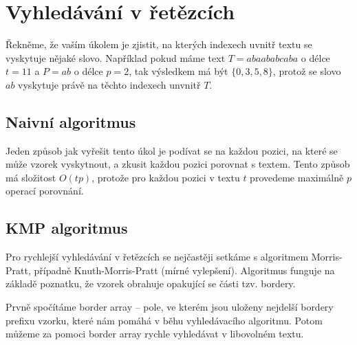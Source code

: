 \documentclass{article}
\begin{document}
\section{Vyhledávání v řetězcích}
Řekněme, že vaším úkolem je zjistit, na kterých indexech uvnitř textu se vyskytuje nějaké slovo.
Například pokud máme text $T=abaababcaba$ o délce $t=11$ a $P=ab$ o délce $p=2$, tak výsledkem
 má být $\{0,3,5,8\}$, protož se slovo $ab$ vyskytuje právě na těchto indexech unvnitř $T$.

\subsection{Naivní algoritmus}
Jeden způsob jak vyřešit tento úkol je podívat se na každou pozici, na které se může vzorek vyskytnout,
 a zkusit každou pozici porovnat s textem.
Tento způsob má složitost $O(tp)$, protože pro každou pozici v textu $t$ provedeme maximálně $p$ operací porovnání.

\subsection{KMP algoritmus}
Pro rychlejší vyhledávání v řetězcích se nejčastěji setkáme s algoritmem Morris-Pratt, případně Knuth-Morris-Pratt (mírné vylepšení).
Algoritmus funguje na základě poznatku, že vzorek obrahuje opakující se části tzv. bordery.

Prvně spočítáme border array -- pole, ve kterém jsou uloženy nejdelší bordery prefixu vzorku, které nám pomáhá v běhu vyhledávacího algoritmu.
Potom můžeme za pomoci border array rychle vyhledávat v libovolném textu.
\end{document}
